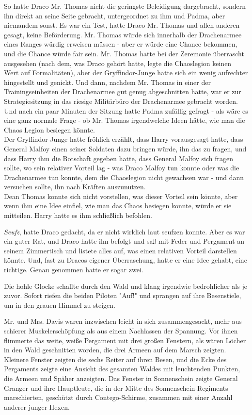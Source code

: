 {So hatte Draco Mr. Thomas nicht die geringste Beleidigung dargebracht, sondern ihn direkt an seine Seite gebracht, untergeordnet zu ihm und Padma, aber niemandem sonst. Es war ein Test, hatte Draco Mr. Thomas und allen anderen gesagt, keine Beförderung. Mr. Thomas würde sich innerhalb der Drachenarmee eines Ranges würdig erweisen müssen - aber er würde eine Chance bekommen, und die Chance würde fair sein. Mr. Thomas hatte bei der Zeremonie überrascht ausgesehen (nach dem, was Draco gehört hatte, legte die Chaoslegion keinen Wert auf Formalitäten), aber der Gryffindor-Junge hatte sich ein wenig aufrechter hingestellt und genickt. Und dann, nachdem Mr. Thomas in einer der Trainingseinheiten der Drachenarmee gut genug abgeschnitten hatte, war er zur Strategiesitzung in das riesige Militärbüro der Drachenarmee gebracht worden. Und nach ein paar Minuten der Sitzung hatte Padma zufällig gefragt - als wäre es eine ganz normale Frage - ob Mr. Thomas irgendwelche Ideen hätte, wie man die Chaos Legion besiegen könnte.\\ Der Gryffindor-Junge hatte fröhlich erzählt, dass Harry vorausgesagt hatte, dass General Malfoy einen seiner Soldaten dazu bringen würde, ihn das zu fragen, und dass Harry ihm die Botschaft gegeben hatte, dass General Malfoy sich fragen sollte, wo sein relativer Vorteil lag - was Draco Malfoy tun konnte oder was die Drachenarmee tun konnte, dem die Chaoslegion nicht gewachsen war - und dann versuchen sollte, ihn nach Kräften auszunutzen.\\ Dean Thomas konnte sich nicht vorstellen, was dieser Vorteil sein könnte, aber wenn ihm eine Idee einfiel, wie man das Chaos besiegen konnte, würde er sie mitteilen. Harry hatte es ihm schließlich befohlen.

\emph{Seufz}, hatte Draco gedacht, da er nicht wirklich laut seufzen konnte. Aber es war ein guter Rat, und Draco hatte ihn befolgt und saß mit Feder und Pergament an seinem Zimmertisch und listete alles auf, was einen relativen Vorteil darstellen könnte. Und, fast zu Dracos eigener Überraschung, hatte er eine Idee gehabt, eine richtige. Genau genommen hatte er sogar zwei.

Die hohle Glocke schallte durch den Wald und klang irgendwie bedrohlicher als je zuvor. Sofort riefen die beiden Piloten "Auf!" und sprangen auf ihre Besenstiele, um in den grauen Himmel zu steigen.

Mr. und Mrs. Davis waren inzwischen leicht in sich zusammengesackt, mehr aus schierer Muskelerschöpfung als aus einem Nachlassen der Spannung. Vor ihnen flimmerte das weite, weiße Pergament mit drei großen Fenstern, als wären Löcher in den Wald geschnitten worden, die drei Armeen auf dem Marsch zeigten. Kleinere Fenster zeigten die sechs Reiter auf ihren Besen, und die Ecke des Pergaments zeigte eine Ansicht des gesamten Waldes mit leuchtenden Punkten, die Armeen und Späher anzeigten. Das Fenster in Sonnenschein zeigte General Granger und ihre Hauptleute, die in der Mitte des Sonnenschein-Regiments marschierten, geschützt durch Contego-Schirme, zusammen mit einer Anzahl anderer junger Hexen.

}
